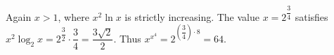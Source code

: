 Again $x>1$, where $x^2\ln x$ is strictly increasing. The value $x = 2^{\dfrac{3}{4}}$ satisfies $x^2 \log_2 x = 2^{\dfrac{3}{2}} \cdot \dfrac{3}{4} = \dfrac{3 \sqrt{2}}{2}$. Thus $x^{x^4} = 2^{(\dfrac{3}{4}) \cdot 8} = \boxed{64}$.
